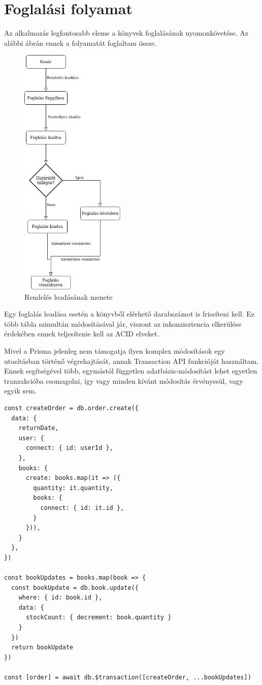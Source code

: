 \section{Foglalási folyamat}

Az alkalmazás legfontosabb eleme a könyvek foglalásának nyomonkövetése. Az alábbi ábrán ennek a folyamatát foglaltam össze.

\begin{figure}[!ht]
  \centering
  \includegraphics[width=50mm, keepaspectratio]{figures/order-flowchart.png}
  \caption{Rendelés leadásának menete}
  \label{fig:OrderChart}
\end{figure}

Egy foglalás leadása esetén a könyvből elérhető darabszámot is frissíteni kell. Ez több tábla szimultán módosításával jár,
viszont az inkonzisztencia elkerülése érdekében ennek teljesítenie kell az ACID elveket.

Mivel a Prisma jelenleg nem támogatja ilyen komplex módosítások egy utasításban történő végrehajtását, annak Transaction API
funkcióját használtam. Ennek segítségével több, egymástól független adatbázis-módosítást lehet egyetlen tranzakcióba csomagolni,
így vagy minden kívánt módosítás érvényesül, vagy egyik sem.

\begin{lstlisting}[caption=Transaction API használata kölcsönzés létrehozásakor]
const createOrder = db.order.create({
  data: {
    returnDate,
    user: {
      connect: { id: userId },
    },
    books: {
      create: books.map(it => ({
        quantity: it.quantity,
        books: {
          connect: { id: it.id },
        }
      })),
    }
  },
})

const bookUpdates = books.map(book => {
  const bookUpdate = db.book.update({
    where: { id: book.id },
    data: {
      stockCount: { decrement: book.quantity }
    }
  })
  return bookUpdate
})

const [order] = await db.$transaction([createOrder, ...bookUpdates])
\end{lstlisting}

